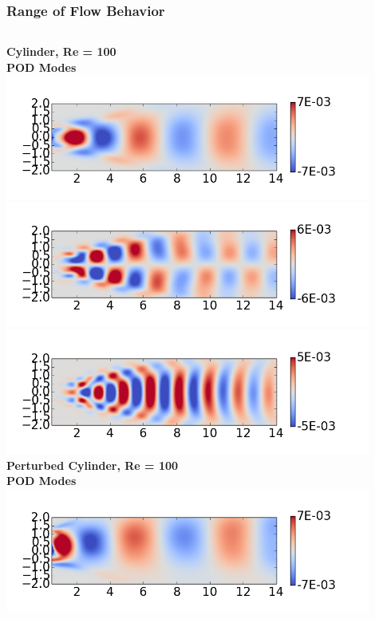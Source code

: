 \documentclass[9pt]{beamer}
\begin{document}
\begin{frame}
\frametitle{Range of Flow Behavior}
\label{sec-3-3}

\begin{columns}[c]
   \centering
    \textbf{Cylinder, Re = 100}
     \\
    \textbf{POD Modes} \\
    \includegraphics[width=0.9\textwidth]{CylinderRe100POD1} \\
    \includegraphics[width=0.9\textwidth]{CylinderRe100POD2} \\
    \includegraphics[width=0.9\textwidth]{CylinderRe100POD3}
   \centering
    \textbf{Perturbed Cylinder, Re = 100}
     \\
    \textbf{POD Modes} \\
    \includegraphics[width=0.9\textwidth]{PerturbRp95Re100POD1} \\

\end{columns}
\end{frame}
\end{document}
